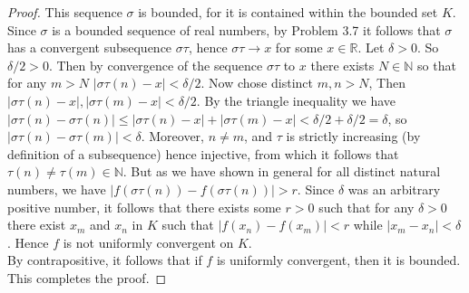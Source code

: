 \documentclass[11pt]{article}
\newcommand{\R}{\mathbb{R}}
\newcommand{\N}{\mathbb{N}}
\theoremstyle{definition}
\begin{document}
\begin{proof}
 This sequence $\sigma$ is bounded, for it is contained within the bounded set $K$. Since $\sigma$ is a bounded sequence of real numbers, by Problem 3.7 it follows that $\sigma$ has a convergent subsequence $\sigma\tau$, hence $\sigma\tau\to x$ for some $x\in \R$. Let $\delta > 0$. So $\delta/2 > 0$. Then by convergence of the sequence $\sigma\tau$ to $x$ there exists $N \in \N$ so that for any $m > N$ $ |\sigma\tau(n) - x| < \delta/2 $. Now chose distinct $m,n > N$, Then $|\sigma\tau(n)-x|, |\sigma\tau(m)-x| < \delta/2$. By the triangle inequality we have $|\sigma\tau(n) - \sigma\tau(n)| \le |\sigma\tau(n)-x| + |\sigma\tau(m)-x| < \delta/2 + \delta/2 = \delta$, so $|\sigma\tau(n) - \sigma\tau(m)| < \delta$. Moreover, $n\ne m$, and $\tau$ is strictly increasing (by definition of a subsequence) hence injective, from which it follows that $\tau(n)\ne \tau(m)\in \N$. But as we have shown in general for all distinct natural numbers, we have $ |f(\sigma\tau(n)) - f(\sigma\tau(n) ) | > r $. Since $\delta$ was an arbitrary positive number, it follows that there exists some $r> 0 $ such that for any $\delta > 0$ there exist $x_m$ and $x_n$ in $K$ such that $ |f(x_n) - f(x_m)| < r $ while $|x_m - x_n| < \delta$. Hence $f$ is not uniformly convergent on $K$. \\
 
 By contrapositive, it follows that if $f$ is uniformly convergent, then it is bounded. This completes the proof.

\end{proof}
\end{document}
